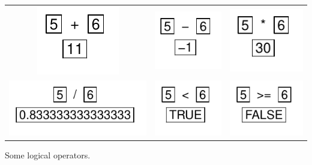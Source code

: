 \documentclass[pdflatex]{article}
\begin{document}
\begin{tabular}{ccc}
\includegraphics{operator_plus} & \includegraphics{operator_minus} & \includegraphics{operator_time}\\
\includegraphics{operator_div} & \includegraphics{operator_strict_lt} & \includegraphics{operator_gt_or_equal}\\
\end{tabular}

Some logical operators.
\end{document}
